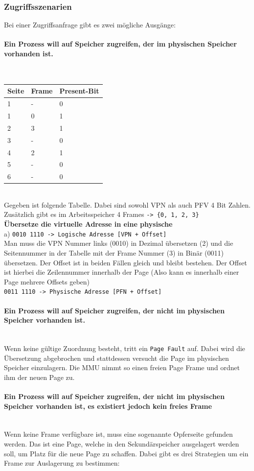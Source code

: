 \documentclass{article}
\newcommand{\paragraphlb}[1]{\paragraph{#1}\mbox{}\\}
\begin{document}
	\subsubsection{Zugriffsszenarien}
	Bei einer Zugriffsanfrage gibt es zwei mögliche Ausgänge:
	\paragraphlb{Ein Prozess will auf Speicher zugreifen, der im physischen Speicher vorhanden ist.}
	\begin{tabular}{| l | l | l |}
		\toprule
		Seite & Frame & Present-Bit \\ \midrule
		1 & - & 0 \\ \hline
		1 & 0 & 1 \\ \hline
		2 & 3 & 1 \\ \hline
		3 & - & 0 \\ \hline
		4 & 2 & 1 \\ \hline
		5 & - & 0 \\ \hline
		6 & - & 0 \\
		\bottomrule
	\end{tabular} \\
	Gegeben ist folgende Tabelle. Dabei sind sowohl VPN als auch PFV 4 Bit Zahlen. Zusätzlich gibt es im Arbeitsspeicher 4 Frames \verb|-> {0, 1, 2, 3}| \\
	\textbf{\small{Übersetze die virtuelle Adresse in eine physische}} \\
	a) \verb|0010 1110 -> Logische Adresse [VPN + Offset]| \\
	Man muss die VPN Nummer links (0010) in Dezimal übersetzen (2) und die Seitennummer in der Tabelle mit der Frame Nummer (3) in Binär (0011) übersetzen. Der Offset ist in beiden Fällen gleich und bleibt bestehen. Der Offset ist hierbei die Zeilennummer innerhalb der Page (Also kann es innerhalb einer Page mehrere Offsets geben) \\
	\verb|0011 1110 -> Physische Adresse [PFN + Offset]|
	\paragraphlb{Ein Prozess will auf Speicher zugreifen, der \textbf{nicht} im physischen Speicher vorhanden ist.}
	Wenn keine gültige Zuordnung besteht, tritt ein \verb|Page Fault| auf. Dabei wird die Übersetzung abgebrochen und stattdessen versucht die Page im physischen Speicher einzulagern. Die MMU nimmt so einen freien Page Frame und ordnet ihm der neuen Page zu.
	\paragraphlb{Ein Prozess will auf Speicher zugreifen, der \textbf{nicht} im physischen Speicher vorhanden ist, es existiert jedoch kein freies Frame}
	Wenn keine Frame verfügbare ist, muss eine sogenannte Opferseite gefunden werden. Das ist eine Page, welche in den Sekundärspeicher ausgelagert werden soll, um Platz für die neue Page zu schaffen. Dabei gibt es drei Strategien um ein Frame zur Auslagerung zu bestimmen:
\end{document}
